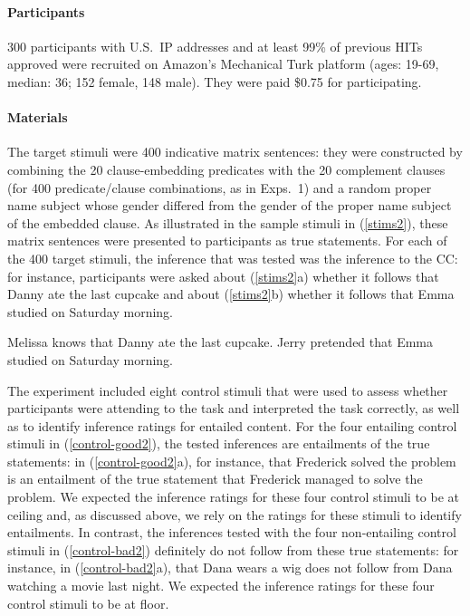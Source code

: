 \documentclass[11pt,fleqn]{article}
\newcommand{\6}{\mbox{$[\hspace*{-.6mm}[$}}
\newcommand{\9}{\mbox{$]\hspace*{-.6mm}]$}}
\begin{document}
\paragraph{Participants} 300 participants with U.S.\ IP addresses and at least 99\% of previous HITs approved were recruited on Amazon's Mechanical Turk platform (ages: 19-69, median: 36; 152 female, 148 male). They were paid \$0.75 for participating.

\paragraph{Materials} The target stimuli were 400 indicative matrix sentences: they were constructed by combining the 20 clause-embedding predicates with the 20 complement clauses (for 400 predicate/clause combinations, as in Exps.~1) and a random proper name subject whose gender differed from the gender of the proper name subject of the embedded clause. As illustrated in the sample stimuli in (\ref{stims2}), these matrix sentences were presented to participants as true statements. For each of the 400 target stimuli, the inference that was tested was the inference to the CC: for instance, participants were asked about (\ref{stims2}a) whether it follows that Danny ate the last cupcake and about (\ref{stims2}b) whether it follows that Emma studied on Saturday morning.

\begin{exe}
\ex\label{stims2}
\begin{xlist}
 Melissa knows that Danny ate the last cupcake.
 Jerry pretended that Emma studied on Saturday morning.
\end{xlist}
\end{exe}

The experiment included eight control stimuli that were used to assess whether participants were attending to the task and interpreted the task correctly, as well as to identify inference ratings for entailed content. For the four entailing control stimuli in (\ref{control-good2}), the tested inferences are entailments of the true statements: in (\ref{control-good2}a), for instance, that Frederick solved the problem is an entailment of the true statement that Frederick managed to solve the problem. We expected the inference ratings for these four control stimuli to be at ceiling and, as discussed above, we rely on the ratings for these stimuli to identify entailments. In contrast, the inferences tested with the four non-entailing control stimuli in (\ref{control-bad2}) definitely do not follow from these true statements: for instance, in (\ref{control-bad2}a), that Dana wears a wig does not follow from Dana watching a movie last night. We expected the inference ratings for these four control stimuli to be at floor.
\end{document}
